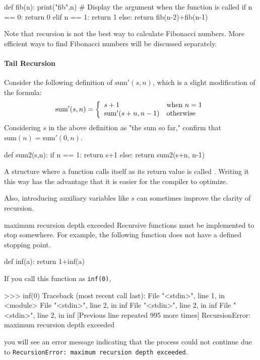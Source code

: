 \begin{pybox}
def fib(n):
    print("fib",n) # Display the argument when the function is called
    if n == 0:
        return 0
    elif n == 1:
        return 1
    else:
        return fib(n-2)+fib(n-1)
\end{pybox}

Note that recursion is not the best way to calculate Fibonacci numbers. More efficient ways to find Fibonacci numbers will be discussed separately.


\paragraph{Tail Recursion}

Consider the following definition of $\mbox{sum}'(s,n)$, which is a slight modification of the formula:
\[
        \mbox{sum}'(s,n) = \left\{
        \begin{array}[c]{ll}
          s+1 & \mbox{when $n=1$}\\
          \mbox{sum}'(s+n, n-1) & \mbox{otherwise}
        \end{array}
      \right.
\]
Considering $s$ in the above definition as "the sum so far," confirm that $\mbox{sum}(n) = \mbox{sum}'(0,n)$.


\begin{pybox}[emph={sum2}]
def sum2(s,n):
    if n == 1:
        return s+1
    else:
        return sum2(s+n, n-1)
\end{pybox}

A structure where a function calls itself as its return value is called . Writing it this way has the advantage that it is easier for the compiler to optimize.

Also, introducing auxiliary variables like $s$ can sometimes improve the clarity of recursion.





\begin{tipsbox}{maximum recursion depth exceeded}
Recursive functions must be implemented to stop somewhere. For example, the following function does not have a defined stopping point.
\begin{pybox}
def inf(a):
    return 1+inf(a)
\end{pybox}
If you call this function as \texttt{inf(0)},
\begin{terminal}[name=RecursionError]
>>> inf(0)
Traceback (most recent call last):
  File "<stdin>", line 1, in <module>
  File "<stdin>", line 2, in inf
  File "<stdin>", line 2, in inf
  File "<stdin>", line 2, in inf
  [Previous line repeated 995 more times]
RecursionError: maximum recursion depth exceeded
\end{terminal}
you will see an error message indicating that the process could not continue due to \texttt{RecursionError: maximum recursion depth exceeded}.

\end{tipsbox}

